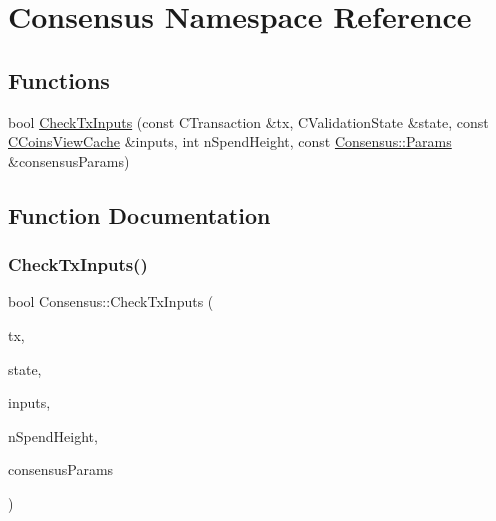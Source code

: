 \hypertarget{namespace_consensus}{}\section{Consensus Namespace Reference}
\label{namespace_consensus}
\subsection*{Functions}
\begin{DoxyCompactItemize}
\item 
bool \mbox{\hyperlink{namespace_consensus_a863563906e78724578e25e92ad4eeeaf}{Check\+Tx\+Inputs}} (const C\+Transaction \&tx, C\+Validation\+State \&state, const \mbox{\hyperlink{class_c_coins_view_cache}{C\+Coins\+View\+Cache}} \&inputs, int n\+Spend\+Height, const \mbox{\hyperlink{chainparams_8h_a5e1ca1b35c3dd1a4e20f18445f28dd9c}{Consensus\+::\+Params}} \&consensus\+Params)
\end{DoxyCompactItemize}


\subsection{Function Documentation}
\mbox{\label{namespace_consensus_a863563906e78724578e25e92ad4eeeaf}} 
\subsubsection{\texorpdfstring{Check\+Tx\+Inputs()}{CheckTxInputs()}}
{\footnotesize\ttfamily bool Consensus\+::\+Check\+Tx\+Inputs (\begin{DoxyParamCaption}\item[{const C\+Transaction \&}]{tx,  }\item[{C\+Validation\+State \&}]{state,  }\item[{const \mbox{\hyperlink{class_c_coins_view_cache}{C\+Coins\+View\+Cache}} \&}]{inputs,  }\item[{int}]{n\+Spend\+Height,  }\item[{const \mbox{\hyperlink{chainparams_8h_a5e1ca1b35c3dd1a4e20f18445f28dd9c}{Consensus\+::\+Params}} \&}]{consensus\+Params }\end{DoxyParamCaption})}

